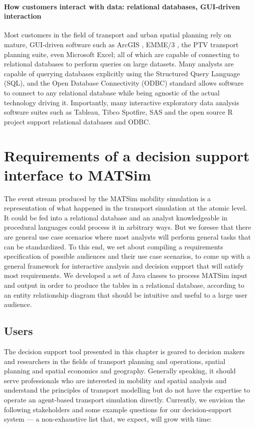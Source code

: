 \paragraph{How customers interact with data: relational databases, GUI-driven interaction}
Most customers in the field of transport and urban spatial planning rely on mature, GUI-driven software such as ArcGIS \citep{ARC_GIS_2011}, EMME/3 \citep{EMME_Webpage_2015}, the PTV \citep{PTV_Webpage_2009} transport planning suite, even Microsoft Excel; all of which are capable of connecting to relational databases to perform queries on large datasets. Many analysts are capable of querying databases explicitly using the Structured Query Language (SQL), and the Open Database Connectivity (ODBC) standard allows software to connect to any relational database while being agnostic of the actual technology driving it. Importantly, many interactive exploratory data analysis software suites such as Tableau, Tibco Spotfire,  SAS and the open source R project support relational databases and ODBC.

\section{Requirements of a decision support interface to MATSim}
\label{sec:analyticsRequirements}
The event stream produced by the MATSim mobility simulation is a representation of what happened in the transport simulation at the atomic level. It could be fed into a relational database and an analyst knowledgeable in procedural languages could process it in arbitrary ways. But we foresee that there are general use case scenarios where most analysts will perform general tasks that can be standardized. To this end, we set about compiling a requirements specification of possible audiences and their use case scenarios, to come up with a general framework for interactive analysis and decision support that will satisfy most requirements. We developed a set of Java classes to process MATSim input and output in order to produce the tables in a relational database, according to an entity relationship diagram that should be intuitive and useful to a large user audience.

\subsection{Users}
The decision support tool presented in this chapter is geared to decision makers and researchers
in the fields of transport planning and operations, spatial planning and spatial economics and
geography. Generally speaking, it should serve professionals who are interested in mobility
and spatial analysis and understand the principles of transport modelling but do not have the
expertise to operate an agent-based transport simulation directly. Currently, we envision the
following stakeholders and some example questions for our decision-support system --- a non-exhaustive list that, we expect, will grow with time:

